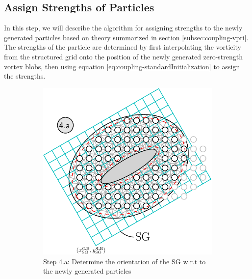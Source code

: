 	
	\subsection{Assign Strengths of Particles}
	\label{subsec:coupling-as}
	
	In this step, we will describe the algorithm for assigning strengths to the newly generated particles based on theory summarized in section \ref{subsec:coupling-vpri}. The strengths of the particle are determined by first interpolating the vorticity from the structured grid onto the position of the newly generated zero-strength vortex blobs, then using equation \ref{eq:coupling-standardInitialization} to assign the strengths.
	
	\begin{figure}[p]
	     \centering
	     \begin{subfigure}[t]{0.55\textwidth}
			\includegraphics[width=\linewidth]{./figures/coupling/assignStrength/assignStrength_part1-crop.pdf}
			\caption{Step 4.a: Determine the orientation of the SG w.r.t to the newly generated particles}
			\label{fig:assignStrength_part1}
		 \end{subfigure}%
		 \qquad %
	     \begin{subfigure}[t]{0.5\textwidth}

\end{subfigure}
\end{figure}
